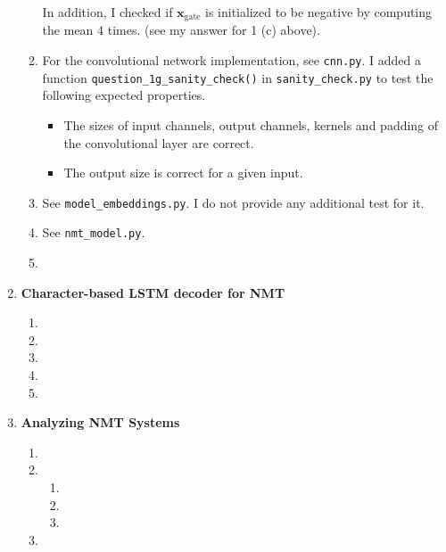 \documentclass[12pt]{article}
\begin{document}
\begin{enumerate}[label=\textbf{\arabic*.}]
\begin{enumerate}[label=(\alph*)]
    In addition, I checked if $\bm{x}_\text{gate}$ is initialized to be negative by computing the mean 4 times. (see my answer for 1 (c) above).
    \item For the convolutional network implementation, see \texttt{cnn.py}. I added a function \texttt{question\_1g\_sanity\_check()} in \texttt{sanity\_check.py} to test the following expected properties.
    \begin{itemize}
      \item The sizes of input channels, output channels, kernels and padding of the convolutional layer are correct.
      \item The output size is correct for a given input.
    \end{itemize}
    \item See \texttt{model\_embeddings.py}. I do not provide any additional test for it.
    \item See \texttt{nmt\_model.py}.
    \item
  \end{enumerate}
  \item \textbf{Character-based LSTM decoder for NMT}
  \begin{enumerate}[label=(\alph*)]
    \item
    \item
    \item
    \item
    \item
  \end{enumerate}
  \item \textbf{Analyzing NMT Systems}
  \begin{enumerate}[label=(\alph*)]
    \item
    \item
    \begin{enumerate}[label=\roman*.]
      \item
      \item
      \item
    \end{enumerate}
    \item
  \end{enumerate}
\end{enumerate}
\end{document}
